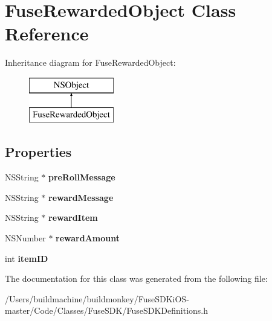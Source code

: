 \hypertarget{interface_fuse_rewarded_object}{}\section{Fuse\+Rewarded\+Object Class Reference}
\label{interface_fuse_rewarded_object}
Inheritance diagram for Fuse\+Rewarded\+Object\+:\begin{figure}[H]
\begin{center}
\leavevmode
\includegraphics[height=2.000000cm]{interface_fuse_rewarded_object}
\end{center}
\end{figure}
\subsection*{Properties}
\begin{DoxyCompactItemize}
\item 
\hypertarget{interface_fuse_rewarded_object_ae1d1c7f4c017e468a6b3c1de53e5baf7}{}N\+S\+String $\ast$ {\bfseries pre\+Roll\+Message}\label{interface_fuse_rewarded_object_ae1d1c7f4c017e468a6b3c1de53e5baf7}

\item 
\hypertarget{interface_fuse_rewarded_object_acd69c101bf237f44d69b5cc310616767}{}N\+S\+String $\ast$ {\bfseries reward\+Message}\label{interface_fuse_rewarded_object_acd69c101bf237f44d69b5cc310616767}

\item 
\hypertarget{interface_fuse_rewarded_object_ac61bc6108654e4d118a6f97b79221111}{}N\+S\+String $\ast$ {\bfseries reward\+Item}\label{interface_fuse_rewarded_object_ac61bc6108654e4d118a6f97b79221111}

\item 
\hypertarget{interface_fuse_rewarded_object_a2db1b3a56b00af0fc99861443d591913}{}N\+S\+Number $\ast$ {\bfseries reward\+Amount}\label{interface_fuse_rewarded_object_a2db1b3a56b00af0fc99861443d591913}

\item 
\hypertarget{interface_fuse_rewarded_object_a07f5ea9173ecc7bdcef8797e803133d7}{}int {\bfseries item\+I\+D}\label{interface_fuse_rewarded_object_a07f5ea9173ecc7bdcef8797e803133d7}

\end{DoxyCompactItemize}


The documentation for this class was generated from the following file\+:\begin{DoxyCompactItemize}
\item 
/\+Users/buildmachine/buildmonkey/\+Fuse\+S\+D\+Ki\+O\+S-\/master/\+Code/\+Classes/\+Fuse\+S\+D\+K/Fuse\+S\+D\+K\+Definitions.\+h\end{DoxyCompactItemize}
